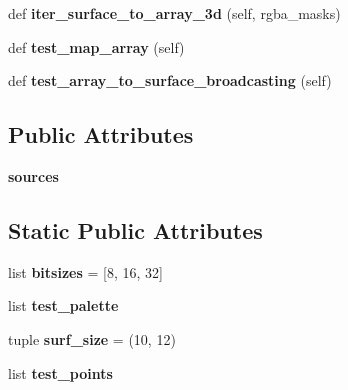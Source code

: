 \begin{DoxyCompactItemize}
\mbox{\label{classpygame_1_1tests_1_1pixelcopy__test_1_1_pixelcopy_module_test_a0b7c858f9ee752c0716537676675c9aa}} 
def {\bfseries iter\+\_\+surface\+\_\+to\+\_\+array\+\_\+3d} (self, rgba\+\_\+masks)
\item 
\mbox{\label{classpygame_1_1tests_1_1pixelcopy__test_1_1_pixelcopy_module_test_a8f26822af48834beceb5d598dabd5ff8}} 
def {\bfseries test\+\_\+map\+\_\+array} (self)
\item 
\mbox{\label{classpygame_1_1tests_1_1pixelcopy__test_1_1_pixelcopy_module_test_ab2f6fdcf4a77f9cb4587cc091b69cca2}} 
def {\bfseries test\+\_\+array\+\_\+to\+\_\+surface\+\_\+broadcasting} (self)
\end{DoxyCompactItemize}
\subsection*{Public Attributes}
\begin{DoxyCompactItemize}
\item 
\mbox{\label{classpygame_1_1tests_1_1pixelcopy__test_1_1_pixelcopy_module_test_a31c1ba0873ba3584a594e2a09f414641}} 
{\bfseries sources}
\end{DoxyCompactItemize}
\subsection*{Static Public Attributes}
\begin{DoxyCompactItemize}
\item 
\mbox{\label{classpygame_1_1tests_1_1pixelcopy__test_1_1_pixelcopy_module_test_a0d67944ad2edd8f00b4c20d3650488cf}} 
list {\bfseries bitsizes} = \mbox{[}8, 16, 32\mbox{]}
\item 
list {\bfseries test\+\_\+palette}
\item 
\mbox{\label{classpygame_1_1tests_1_1pixelcopy__test_1_1_pixelcopy_module_test_a23206e376822190ec90f7c96f1accf63}} 
tuple {\bfseries surf\+\_\+size} = (10, 12)
\item 
list {\bfseries test\+\_\+points}
\end{DoxyCompactItemize}


